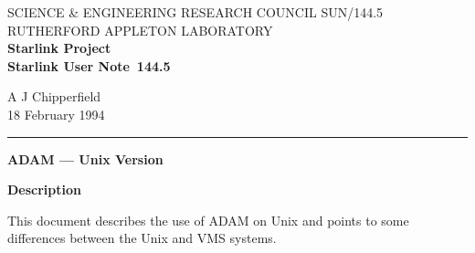 \pagestyle{myheadings}

\newcommand{\stardoccategory}  {Starlink User Note}
\newcommand{\stardocinitials}  {SUN}
\newcommand{\stardocnumber}    {144.5}
\newcommand{\stardocauthors}   {A J Chipperfield}
\newcommand{\stardocdate}      {18 February 1994}
\newcommand{\stardoctitle}     {ADAM --- Unix Version}

\newcommand{\stardocname}{\stardocinitials /\stardocnumber}
\renewcommand{\_}{{\tt\char'137}}     %
\markright{\stardocname}
\setlength{\textwidth}{160mm}
\setlength{\textheight}{230mm}
\setlength{\topmargin}{-2mm}
\setlength{\oddsidemargin}{0mm}
\setlength{\evensidemargin}{0mm}
\setlength{\parindent}{0mm}
\setlength{\parskip}{\medskipamount}
\setlength{\unitlength}{1mm}



\thispagestyle{empty}
SCIENCE \& ENGINEERING RESEARCH COUNCIL \hfill \stardocname\\
RUTHERFORD APPLETON LABORATORY\\
{\large\bf Starlink Project\\}
{\large\bf \stardoccategory\ \stardocnumber}
\begin{flushright}
\stardocauthors\\
\stardocdate
\end{flushright}
\vspace{-4mm}
\rule{\textwidth}{0.5mm}
\vspace{5mm}
\begin{center}
{\Large\bf \stardoctitle}
\end{center}
\vspace{5mm}


\begin{center}
{\Large\bf Description}
\end{center}

This document describes the use of ADAM on Unix and points to some 
differences between the Unix and VMS systems.

